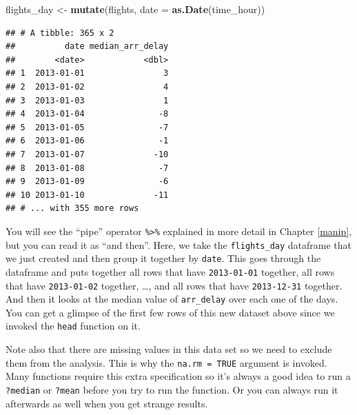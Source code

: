 \documentclass[]{tufte-book}
\newenvironment{Shaded}{\begin{snugshade}}{\end{snugshade}}
\newcommand{\KeywordTok}[1]{\textcolor[rgb]{0.13,0.29,0.53}{\textbf{{#1}}}}
\newcommand{\DataTypeTok}[1]{\textcolor[rgb]{0.13,0.29,0.53}{{#1}}}
\newcommand{\StringTok}[1]{\textcolor[rgb]{0.31,0.60,0.02}{{#1}}}
\newcommand{\OtherTok}[1]{\textcolor[rgb]{0.56,0.35,0.01}{{#1}}}
\newcommand{\NormalTok}[1]{{#1}}
\begin{document}
\begin{Shaded}
\begin{Highlighting}[]
\NormalTok{flights_day <-}\StringTok{ }\KeywordTok{mutate}\NormalTok{(flights, }\DataTypeTok{date =} \KeywordTok{as.Date}\NormalTok{(time_hour))}
\end{Highlighting}
\end{Shaded}

\begin{Shaded}
\end{Shaded}

\begin{verbatim}
## # A tibble: 365 x 2
##          date median_arr_delay
##        <date>            <dbl>
## 1  2013-01-01                3
## 2  2013-01-02                4
## 3  2013-01-03                1
## 4  2013-01-04               -8
## 5  2013-01-05               -7
## 6  2013-01-06               -1
## 7  2013-01-07              -10
## 8  2013-01-08               -7
## 9  2013-01-09               -6
## 10 2013-01-10              -11
## # ... with 355 more rows
\end{verbatim}

You will see the ``pipe'' operator \texttt{\%\textgreater{}\%} explained
in more detail in Chapter \ref{manip}, but you can read it as ``and
then''. Here, we take the \texttt{flights\_day} dataframe that we just
created and then group it together by \texttt{date}. This goes through
the dataframe and puts together all rows that have \texttt{2013-01-01}
together, all rows that have \texttt{2013-01-02} together, \ldots{}, and
all rows that have \texttt{2013-12-31} together. And then it looks at
the median value of \texttt{arr\_delay} over each one of the days. You
can get a glimpse of the first few rows of this new dataset above since
we invoked the \texttt{head} function on it.

Note also that there are missing values in this data set so we need to
exclude them from the analysis. This is why the \texttt{na.rm\ =\ TRUE}
argument is invoked. Many functions require this extra specification so
it's always a good idea to run a \texttt{?median} or \texttt{?mean}
before you try to run the function. Or you can always run it afterwards
as well when you get strange results.
\end{document}

